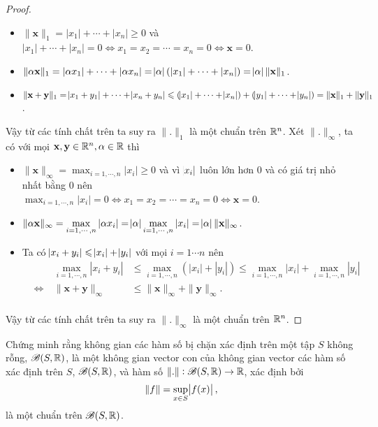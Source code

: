 \begin{proof}
\begin{itemize}
    \item $\|\mathbf{x}\|_1 = |x_1|+\cdots+|x_n| \geq 0$
        và $|x_1|+\cdots+|x_n| = 0 \Leftrightarrow x_1 = x_2 = \cdots = x_n = 0 \Leftrightarrow \mathbf{x} = 0$.
    \item $\|\mathbf{\alpha x}\|_1 = |\alpha x_1|+\cdots+|\alpha x_n| = \abs{\alpha} (|x_1|+\cdots+|x_n|) = \abs{\alpha} \|\mathbf{x}\|_1$.
    \item $\|\mathbf{x}+\mathbf{y}\|_1 = \abs{x_1 + y_1} + \cdots + \abs{x_n + y_n} \leqslant (\abs{x_1} + \cdots + \abs{x_n}) + (\abs{y_1} + \cdots + \abs{y_n}) = \|\mathbf{x}\|_1+\|\mathbf{y}\|_1$.
\end{itemize}
Vậy từ các tính chất trên ta suy ra $\|\mathbf{.}\|_1$ là một chuẩn trên $\mathbb R^n$.\QEDFill\nll
Xét $\|\mathbf{.}\|_{\infty}$, ta có với mọi $\mathbf{x}, \mathbf{y} \in \mathbb R^n, \alpha \in \mathbb R$ thì
\begin{itemize}
    \item $\|\mathbf{x}\|_{\infty} = \displaystyle\max_{i = 1,\cdots,n} |x_i| \geq 0$
        và vì $\abs{x_i}$ luôn lớn hơn $0$ và có giá trị nhỏ nhất bằng $0$ nên\\$\displaystyle\max_{i = 1,\cdots,n} |x_i| = 0 \Leftrightarrow x_1 = x_2 = \cdots = x_n = 0 \Leftrightarrow \mathbf{x} = 0$.
    \item $\|\mathbf{\alpha x}\|_{\infty} = \displaystyle\max_{i = 1,\cdots,n} |\alpha x_i| = \abs{\alpha}\displaystyle\max_{i = 1,\cdots,n} |x_i| = \abs{\alpha} \|\mathbf{x}\|_{\infty}$.
    \item Ta có $\abs{x_i + y_i} \leqslant \abs{x_i} + \abs{y_i}$ với mọi $i = 1\cdots n$ nên
    \begin{alignat*}{3}
        & & \max_{i = 1,\cdots,n} |x_i + y_i| &\leq \max_{i = 1,\cdots,n} (|x_i| + |y_i|) \leq \max_{i = 1,\cdots,n} |x_i| + \max_{i = 1,\cdots,n} |y_i| \\
        &\Leftrightarrow\ & \|\mathbf{x} + \mathbf{y}\|_{\infty} &\leq \|\mathbf{x}\|_{\infty} + \|\mathbf{y}\|_{\infty}.\\[-1cm]
    \end{alignat*}
\end{itemize}
Vậy từ các tính chất trên ta suy ra $\|\mathbf{.}\|_{\infty}$ là một chuẩn trên $\mathbb R^n$.
\end{proof}

\begin{exercise}{4}
    Chứng minh rằng không gian các hàm số bị chặn xác định trên một tập $S$ không rỗng, $\mathscr{B}(S,\mathbb R)$, là một không gian vector con của không gian vector các hàm số xác định trên $S$, $\mathscr{B}(S,\mathbb R)$, và hàm số $\|.\|: \mathscr{B}(S,\mathbb R) \rightarrow \mathbb R$, xác định bởi
    $$
        \|f\| = \sup_{x \in S} \abs{f(x)},
    $$
    là một chuẩn trên $\mathscr{B}(S,\mathbb R)$.
\end{exercise}

